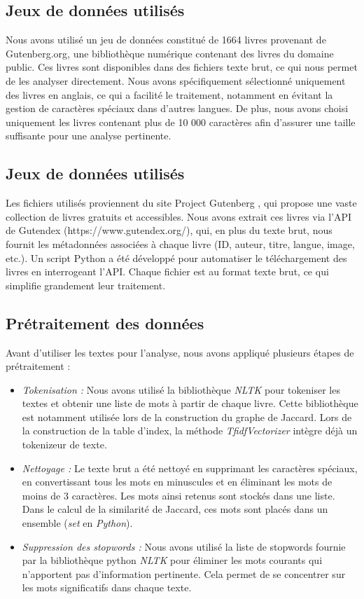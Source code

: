 \documentclass{article}
\begin{document}
    \subsection{Jeux de données utilisés}
    Nous avons utilisé un jeu de données constitué de 1664 livres provenant de Gutenberg.org, une bibliothèque numérique contenant des livres du domaine public. Ces livres sont disponibles dans des fichiers texte brut, ce qui nous permet de les analyser directement. Nous avons spécifiquement sélectionné uniquement des livres en anglais, ce qui a facilité le traitement, notamment en évitant la gestion de caractères spéciaux dans d’autres langues. De plus, nous avons choisi uniquement les livres contenant plus de 10 000 caractères afin d’assurer une taille suffisante pour une analyse pertinente.

    \subsection{Jeux de données utilisés}
    Les fichiers utilisés proviennent du site Project Gutenberg \cite{gutenberg}, qui propose une vaste collection de livres gratuits et accessibles. Nous avons extrait ces livres via l’API de Gutendex (https://www.gutendex.org/), qui, en plus du texte brut, nous fournit les métadonnées associées à chaque livre (ID, auteur, titre, langue, image, etc.). Un script Python a été développé pour automatiser le téléchargement des livres en interrogeant l’API. Chaque fichier est au format texte brut, ce qui simplifie grandement leur traitement.

    \subsection{Prétraitement des données}
    Avant d’utiliser les textes pour l’analyse, nous avons appliqué plusieurs étapes de prétraitement :
    \begin{itemize}
        \item \textit{Tokenisation :} Nous avons utilisé la bibliothèque \textit{NLTK} pour tokeniser les textes et obtenir une liste de mots à partir de chaque livre. Cette bibliothèque est notamment utilisée lors de la construction du graphe de Jaccard. Lors de la construction de la table d’index, la méthode \textit{TfidfVectorizer} intègre déjà un tokenizeur de texte.
        \item \textit{Nettoyage : }Le texte brut a été nettoyé en supprimant les caractères spéciaux, en convertissant tous les mots en minuscules et en éliminant les mots de moins de 3 caractères. Les mots ainsi retenus sont stockés dans une liste. Dans le calcul de la similarité de Jaccard, ces mots sont placés dans un ensemble (\textit{set} en \textit{Python}).
        \item \textit{Suppression des stopwords :} Nous avons utilisé la liste de stopwords fournie par la bibliothèque python \textit{NLTK} pour éliminer les mots courants qui n’apportent pas d’information pertinente. Cela permet de se concentrer sur les mots significatifs dans chaque texte.
    \end{itemize}
\end{document}
